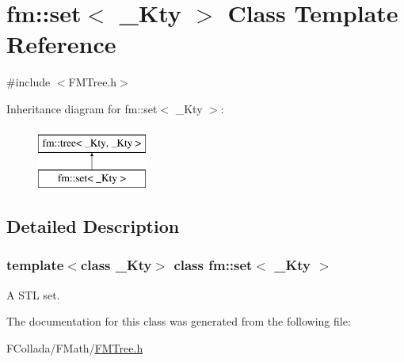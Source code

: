 \hypertarget{classfm_1_1set}{
\section{fm::set$<$ \_\-Kty $>$ Class Template Reference}
\label{classfm_1_1set}
}


{\ttfamily \#include $<$FMTree.h$>$}

Inheritance diagram for fm::set$<$ \_\-Kty $>$:\begin{figure}[H]
\begin{center}
\leavevmode
\includegraphics[height=2.000000cm]{classfm_1_1set}
\end{center}
\end{figure}


\subsection{Detailed Description}
\subsubsection*{template$<$class \_\-Kty$>$ class fm::set$<$ \_\-Kty $>$}

A STL set. 

The documentation for this class was generated from the following file:\begin{DoxyCompactItemize}
\item 
FCollada/FMath/\hyperlink{FMTree_8h}{FMTree.h}\end{DoxyCompactItemize}
